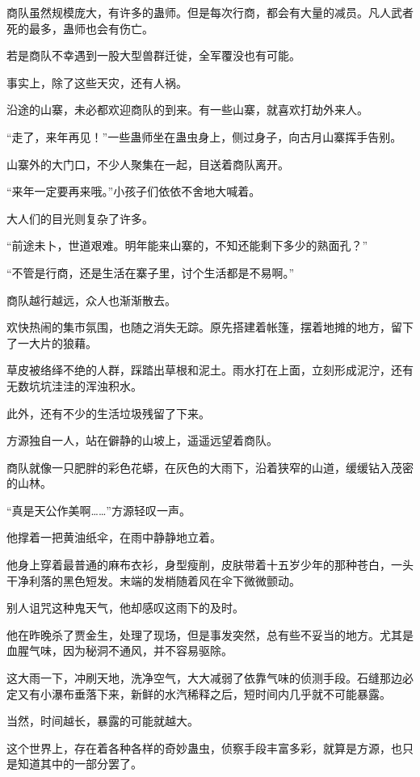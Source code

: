 \begin{this_body}
商队虽然规模庞大，有许多的蛊师。但是每次行商，都会有大量的减员。凡人武者死的最多，蛊师也会有伤亡。

若是商队不幸遇到一股大型兽群迁徙，全军覆没也有可能。

事实上，除了这些天灾，还有人祸。

沿途的山寨，未必都欢迎商队的到来。有一些山寨，就喜欢打劫外来人。

“走了，来年再见！”一些蛊师坐在蛊虫身上，侧过身子，向古月山寨挥手告别。

山寨外的大门口，不少人聚集在一起，目送着商队离开。

“来年一定要再来哦。”小孩子们依依不舍地大喊着。

大人们的目光则复杂了许多。

“前途未卜，世道艰难。明年能来山寨的，不知还能剩下多少的熟面孔？”

“不管是行商，还是生活在寨子里，讨个生活都是不易啊。”

商队越行越远，众人也渐渐散去。

欢快热闹的集市氛围，也随之消失无踪。原先搭建着帐篷，摆着地摊的地方，留下了一大片的狼藉。

草皮被络绎不绝的人群，踩踏出草根和泥土。雨水打在上面，立刻形成泥泞，还有无数坑坑洼洼的浑浊积水。

此外，还有不少的生活垃圾残留了下来。

方源独自一人，站在僻静的山坡上，遥遥远望着商队。

商队就像一只肥胖的彩色花蟒，在灰色的大雨下，沿着狭窄的山道，缓缓钻入茂密的山林。

“真是天公作美啊……”方源轻叹一声。

他撑着一把黄油纸伞，在雨中静静地立着。

他身上穿着最普通的麻布衣衫，身型瘦削，皮肤带着十五岁少年的那种苍白，一头干净利落的黑色短发。末端的发梢随着风在伞下微微颤动。

别人诅咒这种鬼天气，他却感叹这雨下的及时。

他在昨晚杀了贾金生，处理了现场，但是事发突然，总有些不妥当的地方。尤其是血腥气味，因为秘洞不通风，并不容易驱除。

这大雨一下，冲刷天地，洗净空气，大大减弱了依靠气味的侦测手段。石缝那边必定又有小瀑布垂落下来，新鲜的水汽稀释之后，短时间内几乎就不可能暴露。

当然，时间越长，暴露的可能就越大。

这个世界上，存在着各种各样的奇妙蛊虫，侦察手段丰富多彩，就算是方源，也只是知道其中的一部分罢了。


\end{this_body}
